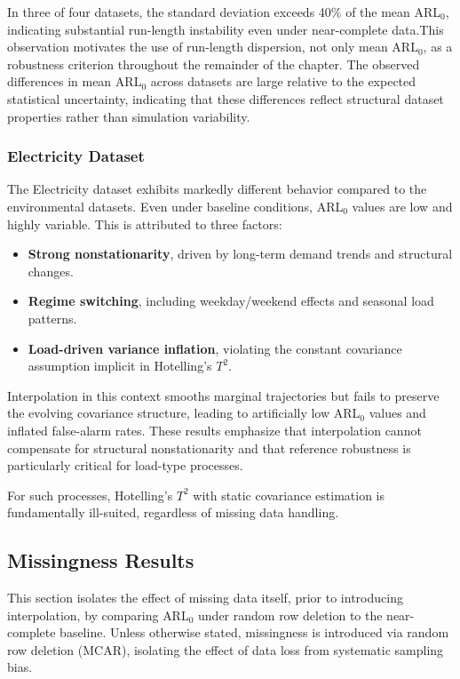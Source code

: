 In three of four datasets, the standard deviation exceeds 40\% of the mean \ac{ARL}$_0$, indicating substantial run-length instability even under near-complete data.This observation motivates the use of run-length dispersion, not only mean ARL$_0$, as a robustness criterion throughout the remainder of the chapter. The observed differences in mean \ac{ARL}$_0$ across datasets are large relative to the expected statistical uncertainty, indicating that these differences reflect structural dataset properties rather than simulation variability.

\subsubsection{Electricity Dataset}

The Electricity dataset \cite{makonin2015ampds} exhibits markedly different behavior compared to the environmental datasets. Even under baseline conditions, \ac{ARL}$_0$ values are low and highly variable. This is attributed to three factors:

\begin{itemize}
\item \textbf{Strong nonstationarity}, driven by long-term demand trends and structural changes.
\item \textbf{Regime switching}, including weekday/weekend effects and seasonal load patterns.
\item \textbf{Load-driven variance inflation}, violating the constant covariance assumption implicit in Hotelling's $T^2$.
\end{itemize}

Interpolation in this context smooths marginal trajectories but fails to preserve the evolving covariance structure, leading to artificially low \ac{ARL}$_0$ values and inflated false-alarm rates. These results emphasize that interpolation cannot compensate for structural nonstationarity and that reference robustness is particularly critical for load-type processes.

For such processes, Hotelling’s $T^2$ with static covariance estimation is fundamentally ill-suited, regardless of missing data handling.

\subsection{Missingness Results}

This section isolates the effect of missing data itself, prior to introducing interpolation, by comparing \ac{ARL}$_0$ under random row deletion to the near-complete baseline.
Unless otherwise stated, missingness is introduced via random row deletion (MCAR), isolating the effect of data loss from systematic sampling bias.

